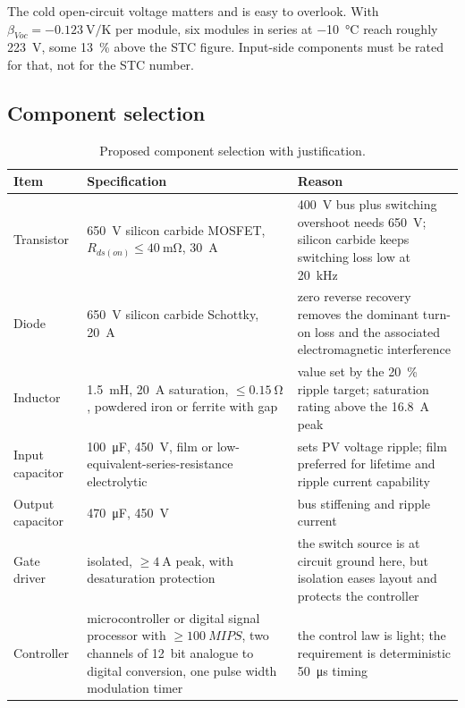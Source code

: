 The cold open-circuit voltage matters and is easy to overlook. With
$\beta_{Voc} = \SI{-0.123}{\volt\per\kelvin}$ per module, six modules in series
at \SI{-10}{\celsius} reach roughly \SI{223}{\volt}, some \SI{13}{\percent}
above the STC figure. Input-side components must be rated for that, not for the
STC number.

\subsection{Component selection}

\begin{table}[htbp]
\centering
\caption{Proposed component selection with justification.}
\label{tab:bom}
\begin{tabular}{@{}p{}p{}p{}@{}}
\toprule
\textbf{Item} & \textbf{Specification} & \textbf{Reason} \\
\midrule
Transistor & \SI{650}{\volt} silicon carbide MOSFET, $R_{ds(on)} \le \SI{40}{\milli\ohm}$, \SI{30}{\ampere} & \SI{400}{\volt} bus plus switching overshoot needs \SI{650}{\volt}; silicon carbide keeps switching loss low at \SI{20}{\kilo\hertz} \\
Diode & \SI{650}{\volt} silicon carbide Schottky, \SI{20}{\ampere} & zero reverse recovery removes the dominant turn-on loss and the associated electromagnetic interference \\
Inductor & \SI{1.5}{\milli\henry}, \SI{20}{\ampere} saturation, $\le \SI{0.15}{\ohm}$, powdered iron or ferrite with gap & value set by the \SI{20}{\percent} ripple target; saturation rating above the \SI{16.8}{\ampere} peak \\
Input capacitor & \SI{100}{\micro\farad}, \SI{450}{\volt}, film or low-equivalent-series-resistance electrolytic & sets PV voltage ripple; film preferred for lifetime and ripple current capability \\
Output capacitor & \SI{470}{\micro\farad}, \SI{450}{\volt} & bus stiffening and ripple current \\
Gate driver & isolated, $\ge \SI{4}{\ampere}$ peak, with desaturation protection & the switch source is at circuit ground here, but isolation eases layout and protects the controller \\
Controller & microcontroller or digital signal processor with $\ge \SI{100}{MIPS}$, two channels of \SI{12}{bit} analogue to digital conversion, one pulse width modulation timer & the control law is light; the requirement is deterministic \SI{50}{\micro\second} timing \\
\bottomrule
\end{tabular}
\end{table}

